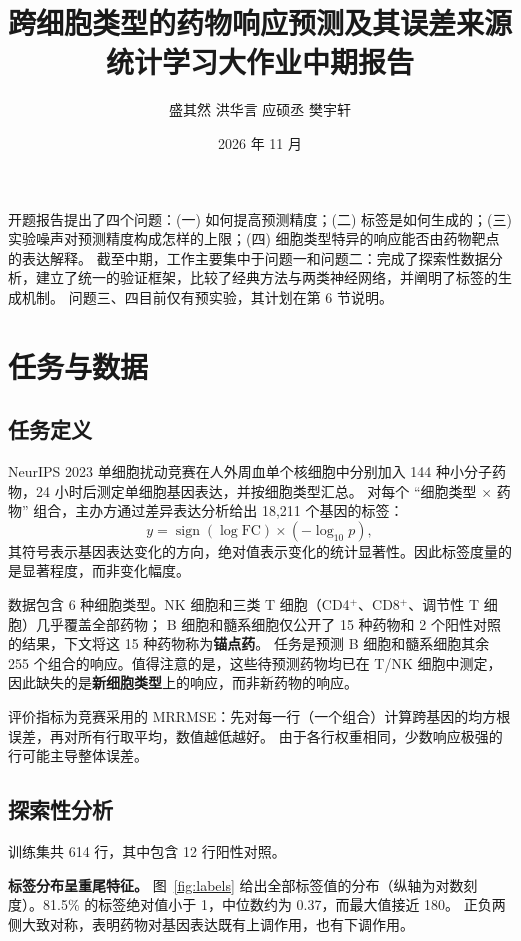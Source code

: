 \documentclass[11pt,a4paper]{article}
\title{\bfseries 跨细胞类型的药物响应预测及其误差来源\\[0.3em]
\large 统计学习大作业中期报告}
\author{盛其然 \quad 洪华言 \quad 应硕丞 \quad 樊宇轩}
\date{2026 年 11 月}
\begin{document}
\vspace*{-2.5em}
{\let\newpage\relax\maketitle}
\vspace*{-1.5em}

开题报告提出了四个问题：(一) 如何提高预测精度；(二) 标签是如何生成的；(三) 实验噪声对预测精度构成怎样的上限；(四) 细胞类型特异的响应能否由药物靶点的表达解释。
截至中期，工作主要集中于问题一和问题二：完成了探索性数据分析，建立了统一的验证框架，比较了经典方法与两类神经网络，并阐明了标签的生成机制。
问题三、四目前仅有预实验，其计划在第 6 节说明。

\section{任务与数据}

\subsection{任务定义}
NeurIPS 2023 单细胞扰动竞赛在人外周血单个核细胞中分别加入 144 种小分子药物，24 小时后测定单细胞基因表达，并按细胞类型汇总。
对每个 ``细胞类型 $\times$ 药物'' 组合，主办方通过差异表达分析给出 18{,}211 个基因的标签：
\[
y = \operatorname{sign}(\log\mathrm{FC}) \times \left(-\log_{10} p\right),
\]
其符号表示基因表达变化的方向，绝对值表示变化的统计显著性。因此标签度量的是显著程度，而非变化幅度。

数据包含 6 种细胞类型。NK 细胞和三类 T 细胞（CD4$^+$、CD8$^+$、调节性 T 细胞）几乎覆盖全部药物；
B 细胞和髓系细胞仅公开了 15 种药物和 2 个阳性对照的结果，下文将这 15 种药物称为\textbf{锚点药}。
任务是预测 B 细胞和髓系细胞其余 255 个组合的响应。值得注意的是，这些待预测药物均已在 T/NK 细胞中测定，因此缺失的是\textbf{新细胞类型}上的响应，而非新药物的响应。

评价指标为竞赛采用的 MRRMSE：先对每一行（一个组合）计算跨基因的均方根误差，再对所有行取平均，数值越低越好。
由于各行权重相同，少数响应极强的行可能主导整体误差。

\subsection{探索性分析}
训练集共 614 行，其中包含 12 行阳性对照。

\textbf{标签分布呈重尾特征。}
图~\ref{fig:labels} 给出全部标签值的分布（纵轴为对数刻度）。81.5\% 的标签绝对值小于 1，中位数约为 0.37，而最大值接近 180。
正负两侧大致对称，表明药物对基因表达既有上调作用，也有下调作用。
\end{document}
